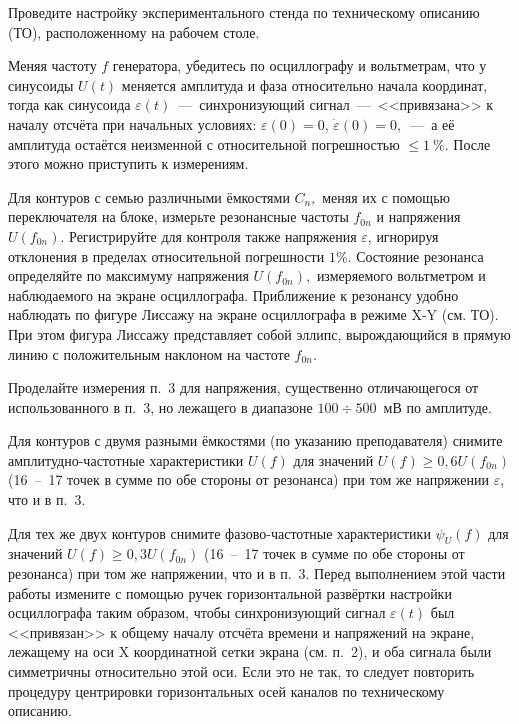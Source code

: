 \begin{lab:task}
    \item Проведите настройку экспериментального стенда по техническому описанию
(ТО), расположенному на рабочем столе.

    \item Меняя частоту $f$ генератора, убедитесь по осциллографу и вольтметрам,
что у синусоиды $U(t)$ меняется амплитуда и фаза относительно начала координат,
тогда как синусоида $\varepsilon(t)$~---~синхронизующий сигнал~---~<<привязана>>
к началу отсчёта при начальных условиях: $\varepsilon(0)=0$,
$\dot{\varepsilon}(0)=0,$~---~а её амплитуда остаётся неизменной с относительной
погрешностью  $\le1~\%$. После этого можно приступить к измерениям.

    \item Для контуров с семью различными ёмкостями $C_n,$ меняя их с помощью
переключателя на блоке, измерьте резонансные частоты $f_{0n}$ и напряжения
$U(f_{0n}).$ Регистрируйте для контроля также напряжения $\varepsilon$,
игнорируя отклонения в пределах относительной погрешности $1\%$. Состояние
резонанса определяйте по максимуму напряжения $U(f_{0n}),$ измеряемого
вольтметром и наблюдаемого на экране осциллографа. Приближение к резонансу
удобно наблюдать по фигуре Лиссажу на экране осциллографа в режиме X-Y (см. ТО).
При этом фигура Лиссажу представляет собой эллипс, вырождающийся в прямую линию
с положительным наклоном  на частоте $f_{0n}.$

    \item {} Проделайте измерения п.~3 для
напряжения, существенно отличающегося от использованного в п.~3, но лежащего в
диапазоне $100\div500$~мВ по амплитуде.

    \item Для контуров с двумя разными ёмкостями (по указанию преподавателя)
снимите амплитудно-частотные характеристики $U(f)$ для значений
$U(f)\ge0,6U(f_{0n})$ (16~--~17 точек в сумме по обе стороны от резонанса) при
том же напряжении $\varepsilon$, что и в п.~3.

    \item Для тех же двух контуров снимите фазово-частотные характеристики
$\psi_U(f)$ для значений $U(f)\ge0,3U(f_{0n})$ (16~--~17 точек в сумме по обе
стороны от резонанса) при том же напряжении, что и в п.~3. Перед выполнением
этой части работы измените с помощью ручек горизонтальной развёртки настройки
осциллографа таким образом, чтобы синхронизующий сигнал $\varepsilon(t)$ был
<<привязан>> к общему началу отсчёта времени и напряжений на экране, лежащему на
оси X координатной сетки экрана (см. п.~2), и оба сигнала были симметричны
относительно этой оси. Если это не так, то следует повторить процедуру
центрировки горизонтальных осей каналов по техническому описанию.


\end{lab:task}

